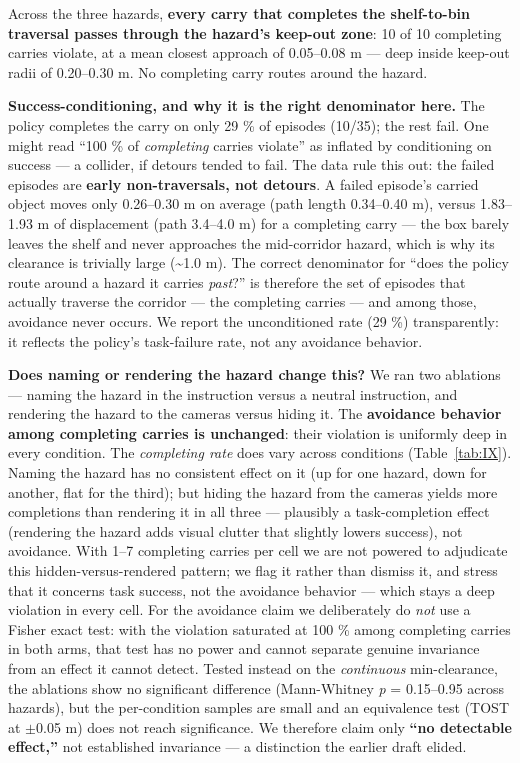 Across the three hazards, \textbf{every carry that completes the shelf-to-bin traversal passes through the hazard's keep-out zone}: 10 of 10 completing carries violate, at a mean closest approach of 0.05--0.08 m --- deep inside keep-out radii of 0.20--0.30 m. No completing carry routes around the hazard.

\textbf{Success-conditioning, and why it is the right denominator here.} The policy completes the carry on only 29 \% of episodes (10/35); the rest fail. One might read ``100 \% of \emph{completing} carries violate'' as inflated by conditioning on success --- a collider, if detours tended to fail. The data rule this out: the failed episodes are \textbf{early non-traversals, not detours}. A failed episode's carried object moves only 0.26--0.30 m on average (path length 0.34--0.40 m), versus 1.83--1.93 m of displacement (path 3.4--4.0 m) for a completing carry --- the box barely leaves the shelf and never approaches the mid-corridor hazard, which is why its clearance is trivially large (\textasciitilde{}1.0 m). The correct denominator for ``does the policy route around a hazard it carries \emph{past}?'' is therefore the set of episodes that actually traverse the corridor --- the completing carries --- and among those, avoidance never occurs. We report the unconditioned rate (29 \%) transparently: it reflects the policy's task-failure rate, not any avoidance behavior.

\textbf{Does naming or rendering the hazard change this?} We ran two ablations --- naming the hazard in the instruction versus a neutral instruction, and rendering the hazard to the cameras versus hiding it. The \textbf{avoidance behavior among completing carries is unchanged}: their violation is uniformly deep in every condition. The \emph{completing rate} does vary across conditions (Table~\ref{tab:IX}). Naming the hazard has no consistent effect on it (up for one hazard, down for another, flat for the third); but hiding the hazard from the cameras yields more completions than rendering it in all three --- plausibly a task-completion effect (rendering the hazard adds visual clutter that slightly lowers success), not avoidance. With 1--7 completing carries per cell we are not powered to adjudicate this hidden-versus-rendered pattern; we flag it rather than dismiss it, and stress that it concerns task success, not the avoidance behavior --- which stays a deep violation in every cell. For the avoidance claim we deliberately do \emph{not} use a Fisher exact test: with the violation saturated at 100 \% among completing carries in both arms, that test has no power and cannot separate genuine invariance from an effect it cannot detect. Tested instead on the \emph{continuous} min-clearance, the ablations show no significant difference (Mann-Whitney \emph{p} = 0.15--0.95 across hazards), but the per-condition samples are small and an equivalence test (TOST at $\pm$0.05 m) does not reach significance. We therefore claim only \textbf{``no detectable effect,''} not established invariance --- a distinction the earlier draft elided.

